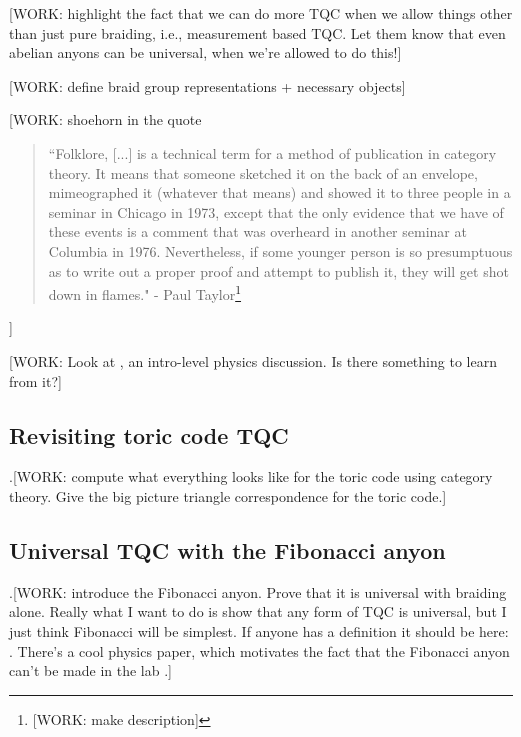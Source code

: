 \documentclass{article}
\theoremstyle{definition}
\numberwithin{figure}{section}
\begin{document}
[WORK: highlight the fact that we can do more TQC when we allow things other than just pure braiding, i.e., measurement based TQC. Let them know that even abelian anyons can be universal, when we're allowed to do this!]

[WORK: define braid group representations + necessary objects]

[WORK: shoehorn in the quote

\begin{quote}
``Folklore, [...] is a technical term for a method of publication in category theory. It means that someone sketched it on the back of an envelope, mimeographed it (whatever that means) and showed it to three people in a seminar in Chicago in 1973, except that the only evidence that we have of these events is a comment that was overheard in another seminar at Columbia in 1976. Nevertheless, if some younger person is so presumptuous as to write out a proper proof and attempt to publish it, they will get shot down in flames." - Paul Taylor\footnote{[WORK: make description]\cite{aubert2019categories}}
\end{quote}

]

[WORK: Look at \cite{lahtinen2017short}, an intro-level physics discussion. Is there something to learn from it?]

\subsection{Revisiting toric code TQC}
\label{Revisiting toric code TQC}

.[WORK: compute what everything looks like for the toric code using category theory. Give the big picture triangle correspondence for the toric code.]


\subsection{Universal TQC with the Fibonacci anyon}
\label{Universal TQC with the Fibonacci anyon}

.[WORK: introduce the Fibonacci anyon. Prove that it is universal with braiding alone. Really what I want to do is show that any form of TQC is universal, but I just think Fibonacci will be simplest. If anyone has a definition it should be here: \cite{trebst2008short}. There's a cool physics paper, which motivates the fact that the Fibonacci anyon can't be made in the lab \cite{freedman2012galois}.]
\end{document}
